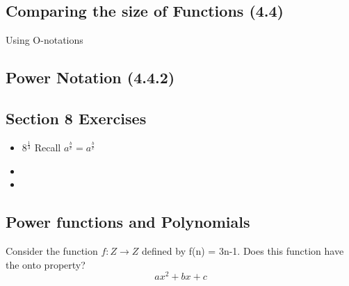 \subsection*{Comparing the size of Functions (4.4)}

Using O-notations

\subsection*{Power Notation (4.4.2)}


\subsection*{Section 8 Exercises}
\begin{itemize}
\item $8^{\frac{1}{3}}$ Recall $a^{\frac{b}{c}} = a^{\frac{b}{c}}$
\item
\item
\end{itemize}


\subsection*{Power functions and Polynomials}


Consider the function $f: Z \rightarrow Z$ defined by f(n) = 3n-1. Does this function have the onto property?
\[ax^2 + bx + c\]

